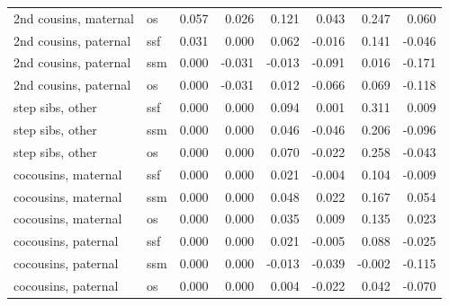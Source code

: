 \begin{tabular}{ll|rr|rr|rr}
2nd cousins, maternal & os & 0.057 & 0.026 & 0.121 & 0.043 & 0.247 & 0.060 \\
2nd cousins, paternal & ssf & 0.031 & 0.000 & 0.062 & -0.016 & 0.141 & -0.046 \\
2nd cousins, paternal & ssm & 0.000 & -0.031 & -0.013 & -0.091 & 0.016 & -0.171 \\
2nd cousins, paternal & os & 0.000 & -0.031 & 0.012 & -0.066 & 0.069 & -0.118 \\
step sibs, other & ssf & 0.000 & 0.000 & 0.094 & 0.001 & 0.311 & 0.009 \\
step sibs, other & ssm & 0.000 & 0.000 & 0.046 & -0.046 & 0.206 & -0.096 \\
step sibs, other & os & 0.000 & 0.000 & 0.070 & -0.022 & 0.258 & -0.043 \\
cocousins, maternal & ssf & 0.000 & 0.000 & 0.021 & -0.004 & 0.104 & -0.009 \\
cocousins, maternal & ssm & 0.000 & 0.000 & 0.048 & 0.022 & 0.167 & 0.054 \\
cocousins, maternal & os & 0.000 & 0.000 & 0.035 & 0.009 & 0.135 & 0.023 \\
cocousins, paternal & ssf & 0.000 & 0.000 & 0.021 & -0.005 & 0.088 & -0.025 \\
cocousins, paternal & ssm & 0.000 & 0.000 & -0.013 & -0.039 & -0.002 & -0.115 \\
cocousins, paternal & os & 0.000 & 0.000 & 0.004 & -0.022 & 0.042 & -0.070 \\
\bottomrule\end{tabular}

